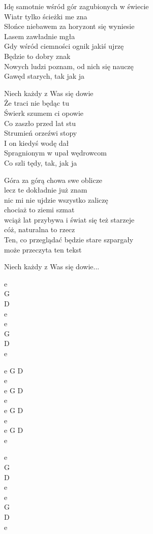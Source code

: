\begin{text}
    Idę samotnie wśród gór zagubionych w świecie\\
    Wiatr tylko ścieżki me zna\\
    Słońce niebawem za horyzont się wyniesie\\
    Lasem zawładnie mgła\\
    Gdy wśród ciemności ognik jakiś ujrzę\\
    Będzie to dobry znak\\
    Nowych ludzi poznam, od nich się nauczę\\
    Gawęd starych, tak jak ja

    \vin Niech każdy z Was się dowie\\
    \vin Że traci nie będąc tu\\
    \vin Świerk szumem ci opowie\\
    \vin Co zaszło przed lat stu\\
    \vin Strumień orzeźwi stopy\\
    \vin I on kiedyś wodę dał\\
    \vin Spragnionym w upał wędrowcom\\
    \vin Co szli tędy, tak, jak ja

    Góra za górą chowa swe oblicze\\
    lecz te dokładnie już znam\\
    nic mi nie ujdzie wszystko zaliczę\\
    chociaż to ziemi szmat\\
    wciąż lat przybywa i świat się też starzeje\\
    cóż, naturalna to rzecz\\
    Ten, co przeglądać będzie stare szpargały\\
    może przeczyta ten tekst

    \vin Niech każdy z Was się dowie...
\end{text}
\begin{chord}
    e\\ 
    G\\
    D\\
    e\\ 
    e\\ 
    G\\
    D\\
    e

    e G D\\ 
    e \\
    e G D\\ 
    e \\
    e G D\\ 
    e \\
    e G D\\ 
    e 

    e\\ 
    G\\
    D\\
    e\\ 
    e\\ 
    G\\
    D\\
    e
\end{chord}